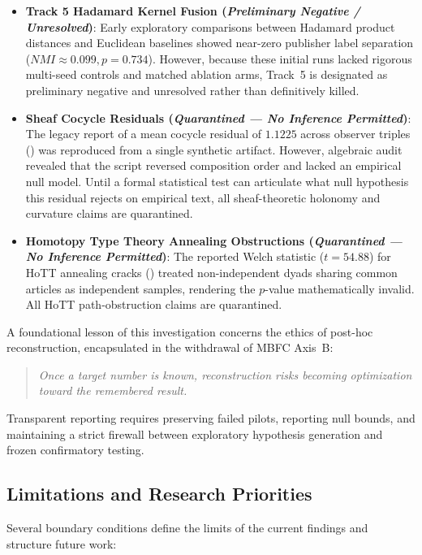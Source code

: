 \begin{itemize}
    \item \textbf{Track 5 Hadamard Kernel Fusion (\emph{Preliminary Negative / Unresolved})}: Early exploratory comparisons between Hadamard product distances and Euclidean baselines showed near-zero publisher label separation ($NMI \approx 0.099, p = 0.734$). However, because these initial runs lacked rigorous multi-seed controls and matched ablation arms, Track~5 is designated as preliminary negative and unresolved rather than definitively killed.
    \item \textbf{Sheaf Cocycle Residuals (\emph{Quarantined --- No Inference Permitted})}: The legacy report of a mean cocycle residual of $1.1225$ across observer triples () was reproduced from a single synthetic artifact. However, algebraic audit revealed that the script reversed composition order and lacked an empirical null model. Until a formal statistical test can articulate what null hypothesis this residual rejects on empirical text, all sheaf-theoretic holonomy and curvature claims are quarantined.
    \item \textbf{Homotopy Type Theory Annealing Obstructions (\emph{Quarantined --- No Inference Permitted})}: The reported Welch statistic ($t = 54.88$) for HoTT annealing cracks () treated non-independent dyads sharing common articles as independent samples, rendering the $p$-value mathematically invalid. All HoTT path-obstruction claims are quarantined.
\end{itemize}

A foundational lesson of this investigation concerns the ethics of post-hoc reconstruction, encapsulated in the withdrawal of MBFC Axis~B:
\begin{quote}
\emph{Once a target number is known, reconstruction risks becoming optimization toward the remembered result.}
\end{quote}
Transparent reporting requires preserving failed pilots, reporting null bounds, and maintaining a strict firewall between exploratory hypothesis generation and frozen confirmatory testing.

\subsection{Limitations and Research Priorities}

Several boundary conditions define the limits of the current findings and structure future work:

